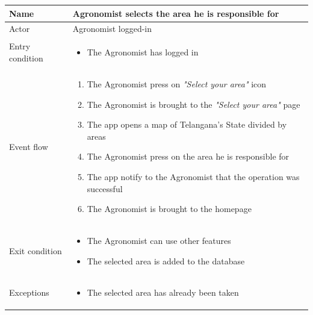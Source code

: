 \begin{table}[H]
    \begin{tabu} to \textwidth {|X|X[4]|}
        \hline
        Name            & Agronomist selects the area he is responsible for          \\ \hline
        Actor           & Agronomist logged-in   \\ \hline
        Entry condition & \begin{itemize}
            \item The Agronomist has logged in
        \end{itemize} \\ \hline
        Event flow      & \begin{enumerate}
            \item The Agronomist press on \emph{"Select your area"} icon
            \item The Agronomist is brought to the \emph{"Select your area"} page
            \item The app opens a map of Telangana's State divided by areas 
            \item The Agronomist press on the area he is responsible for
            \item The app notify to the Agronomist that the operation was successful
            \item The Agronomist is brought to the homepage
        \end{enumerate} \\ \hline
        Exit condition  & \begin{itemize}
            \item The Agronomist can use other features
            \item The selected area is added to the database
        \end{itemize} \\ \hline
        Exceptions      & \begin{itemize}
            \item The selected area has already been taken
        \end{itemize} \\ \hline
    \end{tabu}
\end{table}

